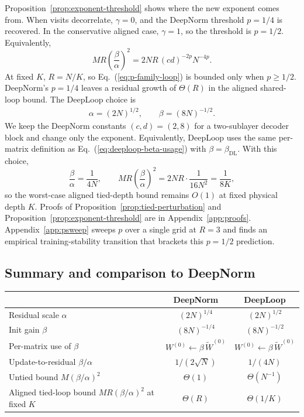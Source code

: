 \documentclass[11pt]{airesearch}
\begin{document}
Proposition~\ref{prop:exponent-threshold} shows where the new exponent comes
from. When visits decorrelate, $\gamma=0$, and the DeepNorm threshold $p=1/4$
is recovered. In the conservative aligned case, $\gamma=1$, so the threshold is
$p=1/2$. Equivalently,
\begin{equation}
  M R\left(\frac{\beta}{\alpha}\right)^2
  =
  2NR\,(cd)^{-2p}N^{-4p}.
  \label{eq:p-family-loop}
\end{equation}
At fixed $K$, $R=N/K$, so Eq.~(\ref{eq:p-family-loop}) is bounded only when
$p\ge 1/2$. DeepNorm's $p=1/4$ leaves a residual growth of $\Theta(R)$ in the
aligned shared-loop bound. The DeepLoop choice is
\begin{align*}
  \alpha=(2N)^{1/2},
  \qquad
  \beta=(8N)^{-1/2}.
\end{align*}
We keep the DeepNorm constants $(c,d)=(2,8)$ for a two-sublayer decoder block
and change only the exponent. Equivalently, DeepLoop uses the same per-matrix
definition as Eq.~(\ref{eq:deeploop-beta-usage}) with
$\beta=\beta_{\mathrm{DL}}$. With this choice,
\[
  \frac{\beta}{\alpha}
  =
  \frac{1}{4N},
  \qquad
  MR\left(\frac{\beta}{\alpha}\right)^2
  =
  2NR\cdot \frac{1}{16N^2}
  =
  \frac{1}{8K},
\]
so the worst-case aligned tied-depth bound remains $O(1)$ at fixed physical
depth $K$. Proofs of Proposition~\ref{prop:tied-perturbation} and
Proposition~\ref{prop:exponent-threshold} are in Appendix~\ref{app:proofs}.
Appendix~\ref{app:psweep} sweeps $p$ over a single grid at $R{=}3$ and
finds an empirical training-stability transition that brackets this
$p{=}1/2$ prediction.

\subsection{Summary and comparison to DeepNorm}
\label{sec:method:summary}

\begin{center}
\begin{tabular}{lcc}
  \toprule
  & DeepNorm & DeepLoop \\
  \midrule
  Residual scale $\alpha$
    & $(2N)^{1/4}$ & $(2N)^{1/2}$ \\
  Init gain $\beta$
    & $(8N)^{-1/4}$ & $(8N)^{-1/2}$ \\
  Per-matrix use of $\beta$
    & $W^{(0)}\leftarrow\beta\,\widetilde W^{(0)}$
    & $W^{(0)}\leftarrow\beta\,\widetilde W^{(0)}$ \\
  Update-to-residual $\beta/\alpha$
    & $1/(2\sqrt{N})$ & $1/(4N)$ \\
  Untied bound $M(\beta/\alpha)^2$
    & $\Theta(1)$ & $\Theta(N^{-1})$ \\
  Aligned tied-loop bound $MR(\beta/\alpha)^2$ at fixed $K$
    & $\Theta(R)$ & $\Theta(1/K)$ \\
  \bottomrule
\end{tabular}
\end{center}
\end{document}
